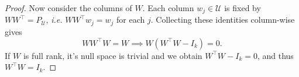 \documentclass[10pt,a4paper]{amsart}
\begin{document}
\begin{proof}
Now consider the columns of $W$. Each column $w_j\in \mathcal{U}$ is fixed by $WW^\top = P_\mathcal{U}$, \emph{i.e.} $WW^\top w_j = w_j$ for each $j$. Collecting these identities column-wise gives 
    \[WW^\top W = W\implies W(W^\top W-I_k) = 0.\]
    If $W$ is full rank, it's null space is trivial and we obtain $W^\top W-I_k = 0$, and thus $W^\top W = I_k$. 

\end{proof}
\end{document}
